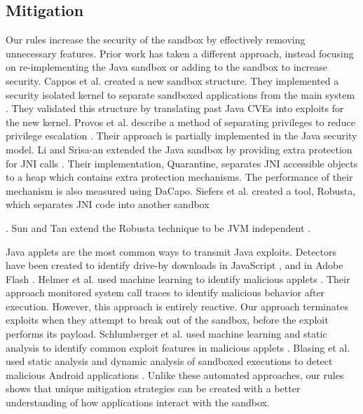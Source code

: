 \documentclass{sig-alternate}
\begin{document}
\subsection{Mitigation}\label{sub:Related-Work-Mitigation}

Our rules increase the security of the sandbox
by effectively removing unnecessary features. Prior work has taken a different
approach, instead focusing on re-implementing the Java sandbox or
adding to the sandbox to increase security. Cappos et al. created
a new sandbox structure. They implemented a security isolated kernel
to separate sandboxed applications from the main system \cite{cappos_retaining_2010}.
They validated this structure by translating past Java CVEs into exploits
for the new kernel. Provos et al. describe a method of separating
privileges to reduce privilege escalation \cite{Provos-PrivilegeEscalation}.
Their approach is partially implemented in the Java security model.
Li and Srisa-an extended the Java sandbox by providing extra protection
for JNI calls \cite{li_quarantine:_2011}. Their implementation, Quarantine,
separates JNI accessible objects to a heap which contains extra protection
mechanisms. The performance of their mechanism is also measured using
DaCapo. Siefers et al. created a tool, Robusta, which separates JNI
code into another sandbox \cite{siefers_robusta:_2010}%

. Sun and Tan extend the Robusta technique to be JVM independent \cite{sun_jvm-portable_2012}. 

Java applets are the most common ways to transmit Java exploits. Detectors
have been created to identify drive-by downloads in JavaScript \cite{cova_detection_2010},
and in Adobe Flash \cite{ford_analyzing_2009}. Helmer et al. used
machine learning to identify malicious applets \cite{helmer_anomalous_2001}.
Their approach monitored system call traces to identify malicious
behavior after execution. However, this approach is entirely reactive.
Our approach terminates exploits when they attempt to break out of
the sandbox, before the exploit performs its payload. Schlumberger
et al. used machine learning and static analysis to identify common
exploit features in malicious applets \cite{schlumberger_jarhead_2012}.
Blasing et al. used static analysis and dynamic analysis of sandboxed
executions to detect malicious Android applications \cite{Blasing-AndriodSandbox}.
Unlike these automated approaches, our rules shows that unique
mitigation strategies can be created with a better understanding of
how applications interact with the sandbox. 
\end{document}
